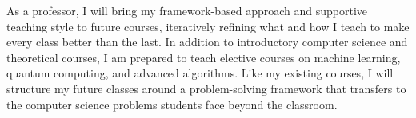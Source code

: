 \documentclass[11pt]{article}
\begin{document}

As a professor, I will bring my framework-based approach and supportive teaching style to future courses, iteratively refining what and how I teach to make every class better than the last. 
In addition to introductory computer science and theoretical courses, I am prepared to teach elective courses on machine learning, quantum computing, and advanced algorithms.
Like my existing courses, I will structure my future classes around a problem-solving framework that transfers to the computer science problems students face beyond the classroom.
\end{document}
